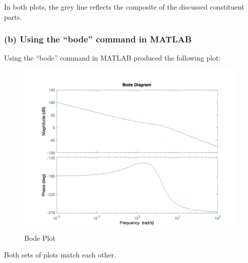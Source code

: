 \documentclass[12pt, letterpaper]{../assignment}
\begin{document}
In both plots, the grey line reflects the composite of the discussed constituent parts.

\subsubsection*{(b) Using the “bode” command in MATLAB}

Using the “bode” command in MATLAB produced the following plot:

\begin{figure}[H]
    \centering
    \includegraphics[width=0.6\linewidth]{./figures/matlab_bode.png}
    \caption{Bode Plot}
    \label{fig:step}
 \end{figure}

 Both sets of plots match each other.
  

\end{document}
